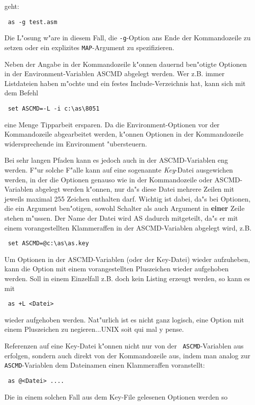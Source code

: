 \documentclass[12pt,a4paper,twoside]{report}
\newcommand{\ii}[1]{{\it #1}}
\newcommand{\bb}[1]{{\bf #1}}
\newcommand{\tty}[1]{{\tt #1}}
\begin{document}
geht:
\begin{verbatim}
 as -g test.asm
\end{verbatim}
Die L"osung w"are in diesem Fall, die \tty{-g}-Option ans Ende der
Kommandozeile zu setzen oder ein explizites \tty{MAP}-Argument zu
spezifizieren.
\par
Neben der Angabe in der Kommandozeile k"onnen dauernd ben"otigte
Optionen in der Environment-Variablen ASCMD abgelegt werden. Wer z.B.
immer Listdateien haben m"ochte und ein festes Include-Verzeichnis hat,
kann sich mit dem Befehl
\begin{verbatim}
 set ASCMD=-L -i c:\as\8051
\end{verbatim}
eine Menge Tipparbeit ersparen.  Da die Environment-Optionen vor der
Kommandozeile abgearbeitet werden, k"onnen Optionen in der
Kommandozeile widersprechende im Environment "ubersteuern.
\par
Bei sehr langen Pfaden kann es jedoch auch in der ASCMD-Variablen eng
werden.  F"ur solche F"alle kann auf eine sogenannte \ii{Key}-Datei
ausgewichen werden, in der die Optionen genauso wie in der Kommandozeile
oder ASCMD-Variablen abgelegt werden k"onnen, nur da"s diese Datei
mehrere Zeilen mit jeweils maximal 255 Zeichen enthalten darf.  Wichtig
ist dabei, da"s bei Optionen, die ein Argument ben"otigen, sowohl Schalter
als auch Argument in \bb{einer} Zeile stehen m"ussen.  Der Name der
Datei wird AS dadurch mitgeteilt, da"s er mit einem vorangestellten
Klammeraffen in der ASCMD-Variablen abgelegt wird, z.B.
\begin{verbatim}
 set ASCMD=@c:\as\as.key
\end{verbatim}
Um Optionen in der ASCMD-Variablen (oder der Key-Datei) wieder aufzuheben,
kann die Option mit einem vorangestellten Pluszeichen wieder aufgehoben
werden.  Soll in einem Einzelfall z.B. doch kein Listing erzeugt werden,
so kann es mit
\begin{verbatim}
 as +L <Datei>
\end{verbatim}
wieder aufgehoben werden.  Nat"urlich ist es nicht ganz logisch, eine
Option mit einem Pluszeichen zu negieren...UNIX soit qui mal y pense.
\par
Referenzen auf eine Key-Datei k"onnen nicht nur von der {\tt
ASCMD}-Variablen aus erfolgen, sondern auch direkt von der Kommandozeile
aus, indem man analog zur {\tt ASCMD}-Variablen dem Dateinamen einen
Klammeraffen voranstellt:
\begin{verbatim}
 as @<Datei> ....
\end{verbatim}
Die in einem solchen Fall aus dem Key-File gelesenen Optionen werden so
\end{document}

